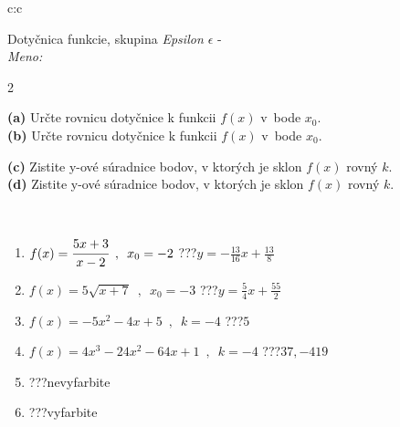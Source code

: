 \documentclass[10pt]{report}
\begin{document}
\begin{tabular}{c:c}
\begin{minipage}[c][104.5mm][t]{0.5\linewidth}
\begin{center}
\vspace{7mm}
{\huge Dotyčnica funkcie, skupina \textit{Epsilon $\epsilon$} -}\\[5mm]
\textit{Meno:}\phantom{xxxxxxxxxxxxxxxxxxxxxxxxxxxxxxxxxxxxxxxxxxxxxxxxxxxxxxxxxxxxxxxxx}\\[5mm]
\begin{minipage}{0.95\linewidth}
\begin{center}
{\small \begin{multicols}{2} \raggedright
\textbf{(a)} Určte rovnicu dotyčnice k funkcii \(f(x)\) v~bode \(x_0\). \\[1mm]
\textbf{(b)} Určte rovnicu dotyčnice k funkcii \(f(x)\) v~bode \(x_0\). \par \columnbreak
\textbf{(c)} Zistite y-ové súradnice bodov, v ktorých je sklon \(f(x)\) rovný \(k\). \\[1mm]
\textbf{(d)} Zistite y-ové súradnice bodov, v ktorých je sklon \(f(x)\) rovný \(k\). \\[1mm]
\end{multicols}
}
\end{center}
\end{minipage}
\\[4mm]
\begin{minipage}{0.79\linewidth}
\begin{center}
\begin{varwidth}{\linewidth}
\begin{enumerate}
\normalsizerr
\item $f(x)=\cfrac{5x+3}{x-2}\enspace , \enspace x_0=-2$\quad \dotfill\; ???\;\dotfill \quad $y = -\frac{13}{16}x+\frac{13}{8}$
\item $f(x)=5\sqrt{x+7}\enspace , \enspace x_0=-3$\quad \dotfill\; ???\;\dotfill \quad $y = \frac{5}{4}x+\frac{55}{2}$
\item $f(x)=-5x^2-4x+5\enspace , \enspace k=-4$\quad \dotfill\; ???\;\dotfill \quad $5$
\item $f(x)=4x^3-24x^2-64x+1\enspace , \enspace k=-4$\quad \dotfill\; ???\;\dotfill \quad $37 , -419$
\item \quad \dotfill\; ???\;\dotfill \quad nevyfarbite
\item \quad \dotfill\; ???\;\dotfill \quad vyfarbite
\end{enumerate}
\end{varwidth}

\end{center}
\end{minipage}
\end{center}
\end{minipage}
\end{tabular}
\end{document}
